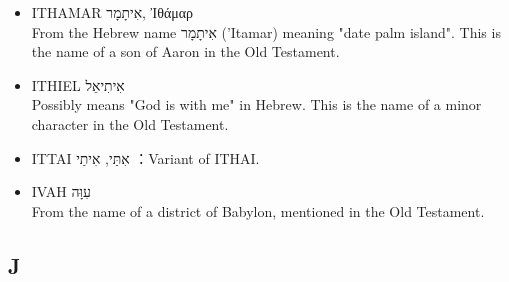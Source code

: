 \begin{itemize}
\item ITHAMAR אִיתָמָר, Ἰθάμαρ \\
From the Hebrew name אִיתָמָר ('Itamar) meaning "date palm island". This is the name of a son of Aaron in the Old Testament.
\item ITHIEL אִיתִיאֵל \\
Possibly means "God is with me" in Hebrew. This is the name of a minor character in the Old Testament.
\item ITTAI אִתַּי, אִיתַי ：Variant of ITHAI.
\item IVAH עִוָּה \\
From the name of a district of Babylon, mentioned in the Old Testament.
\end{itemize}


\subsection{J}

